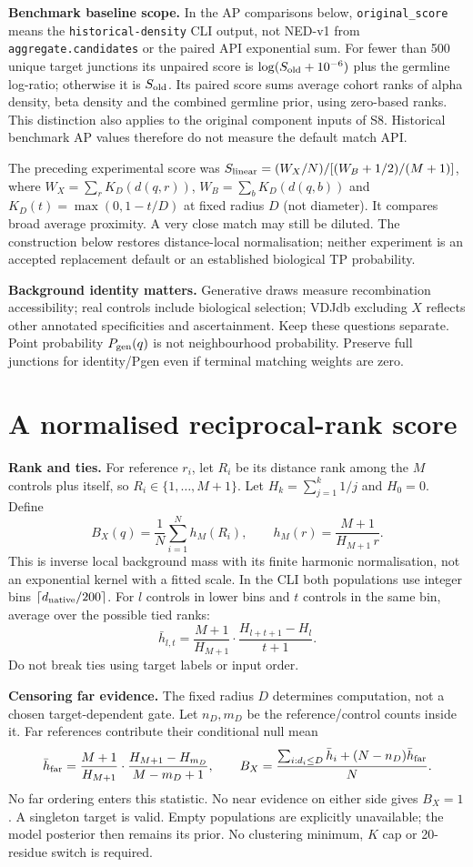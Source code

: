 \documentclass[10pt,a4paper]{article}
\theoremstyle{definition}
\newcommand{\code}[1]{\texttt{\small #1}}
\begin{document}
\textbf{Benchmark baseline scope.} In the AP comparisons below, \code{original\_score} means
the \code{historical-density} CLI output, not NED-v1 from \code{aggregate.candidates} or the
paired API exponential sum. For fewer than 500 unique target junctions its unpaired score is
$\log(S_{\rm old}+10^{-6})$ plus the germline log-ratio; otherwise it is $S_{\rm old}$.
Its paired score sums average cohort ranks of alpha density, beta density and the combined
germline prior, using zero-based ranks. This distinction also applies to the original component
inputs of S8. Historical benchmark AP values therefore do not measure the default match API.

The preceding experimental score was $S_{\rm linear}=(W_X/N)/[(W_B+1/2)/(M+1)]$, where
$W_X=\sum_rK_D(d(q,r))$, $W_B=\sum_bK_D(d(q,b))$ and $K_D(t)=\max(0,1-t/D)$ at fixed radius $D$
(not diameter). It compares broad average proximity. A very close match may still be diluted.
The construction below restores distance-local normalisation; neither experiment is an accepted
replacement default or an established biological TP probability.

\textbf{Background identity matters.} Generative draws measure recombination accessibility; real
controls include biological selection; VDJdb excluding $X$ reflects other annotated specificities
and ascertainment. Keep these questions separate. Point probability $P_{\rm gen}(q)$ is not
neighbourhood probability. Preserve full junctions for identity/Pgen even if terminal matching
weights are zero.

\section{A normalised reciprocal-rank score}
\textbf{Rank and ties.} For reference $r_i$, let $R_i$ be its distance rank among the $M$ controls
plus itself, so $R_i\in\{1,\dots,M+1\}$. Let $H_k=\sum_{j=1}^k1/j$ and $H_0=0$. Define
\[
\boxed{B_X(q)=\frac1N\sum_{i=1}^Nh_M(R_i),\qquad h_M(r)=\frac{M+1}{H_{M+1}\,r}.}
\]
This is inverse local background mass with its finite harmonic normalisation, not an exponential
kernel with a fitted scale. In the CLI both populations use integer bins
$\lceil d_{\rm native}/200\rceil$. For $l$ controls in lower bins and $t$ controls in the same bin,
average over the possible tied ranks:
\[
\bar h_{l,t}=\frac{M+1}{H_{M+1}}\cdot\frac{H_{l+t+1}-H_l}{t+1}.
\]
Do not break ties using target labels or input order.

\textbf{Censoring far evidence.} The fixed radius $D$ determines computation, not a chosen
target-dependent gate. Let $n_D,m_D$ be the reference/control counts inside it. Far references
contribute their conditional null mean
\[
\bar h_{\rm far}=\frac{M+1}{H_{M+1}}\cdot\frac{H_{M+1}-H_{m_D}}{M-m_D+1},\qquad
B_X=\frac{\sum_{i:d_i\le D}\bar h_i+(N-n_D)\bar h_{\rm far}}N .
\]
No far ordering enters this statistic. No near evidence on either side gives $B_X=1$. A singleton
target is valid. Empty populations are explicitly unavailable; the model posterior then remains its
prior. No clustering minimum, $K$ cap or 20-residue switch is required.
\end{document}

